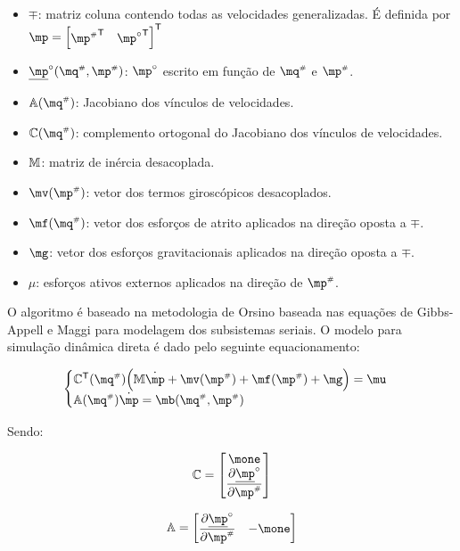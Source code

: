 \documentclass[a4paper,11pt,brazil,fleqn]{article}
\begin{document}
\begin{itemize}
\item $\mp$: matriz coluna contendo todas as velocidades generalizadas. \'E definida por $\mp = \begin{bmatrix} {\mp\ssh}^\msT & {\mp\cir}^\msT \end{bmatrix}^\msT $
\item $\underline{\mp}\cir(\mq\ssh,\mp\ssh)$: $\mp\cir$ escrito em fun\c{c}\~ao de $\mq\ssh$ e $\mp\ssh$.
\item $\mA(\mq\ssh)$: Jacobiano dos v\'inculos de velocidades.
\item $\mC(\mq\ssh)$: complemento ortogonal do Jacobiano dos v\'inculos de velocidades.
\item $\mathbb{M}$: matriz de in\'ercia desacoplada.
\item $\mv(\mp\ssh)$: vetor dos termos girosc\'opicos desacoplados.
\item $\mf(\mq\ssh)$: vetor dos esfor\c{c}os de atrito aplicados na dire\c{c}\~ao oposta a $\mp$.
\item $\mg$: vetor dos esfor\c{c}os gravitacionais aplicados na dire\c{c}\~ao oposta a $\mp$.
\item $\mu $: esfor\c{c}os ativos externos aplicados na dire\c{c}\~ao de $\mp\ssh$.

\end{itemize}

O algoritmo \'e baseado na metodologia de Orsino baseada nas equa\c{c}\~oes de Gibbs-Appell e Maggi para modelagem dos subsistemas seriais. O modelo para simula\c{c}\~ao din\^amica direta \'e dado pelo seguinte equacionamento:

\begin{equation} \label{eq:DinamicaDireta}
\begin{cases}
\mC^\mathsf{T}(\mq\ssh) \Big( \mM \dot{\mp} + \mv(\mp\ssh) + \mf(\mp\ssh) + \mg \Big) = \mu \\
\mA(\mq\ssh) \dot{\mp} = \mb(\mq\ssh,\mp\ssh)
\end{cases}
\end{equation}

Sendo:

\begin{equation} \label{eq:MatrizC}
\mC = \begin{bmatrix}
\mone \\
\displaystyle\frac{\partial \underline{\mp}^\circ}{\partial \mp\ssh}
\end{bmatrix}
\end{equation}

\begin{equation} \label{eq:MatrizA}
\mA = \begin{bmatrix}
\displaystyle\frac{\partial \underline{\mp}^\circ}{\partial \mp\ssh} & -\mone 
\end{bmatrix}
\end{equation}
\end{document}
